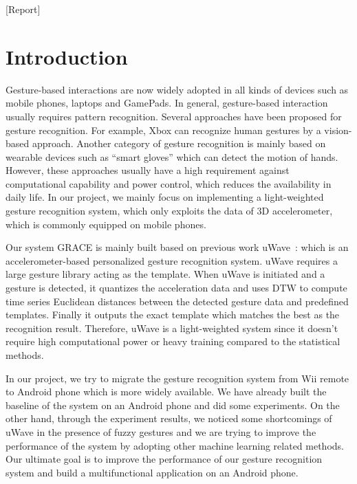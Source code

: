 \documentclass{acm_proc_article-sp}
\begin{document}
[Report]



\section{Introduction}
\label{introduction}
Gesture-based interactions are now widely adopted in all kinds of devices such as mobile phones, laptops and GamePads. In general, gesture-based interaction usually requires pattern recognition. Several approaches have been proposed for gesture recognition. For example, Xbox can recognize human gestures by a vision-based approach. Another category of gesture recognition is mainly based on wearable devices such as ``smart gloves'' which can detect the motion of hands. However, these approaches usually have a high requirement against computational capability and power control, which reduces the availability in daily life. In our project, we mainly focus on implementing a light-weighted gesture recognition system, which only exploits the data of 3D accelerometer, which is commonly equipped on mobile phones.

Our system GRACE is mainly built based on previous work uWave~\cite{liu2009uwave}: which is an accelerometer-based personalized gesture recognition system. uWave requires a large gesture library acting as the template. When uWave is initiated and a gesture is detected, it quantizes the acceleration data and uses DTW to compute time series Euclidean distances between the detected gesture data and predefined templates. Finally it outputs the exact template which matches the best as the recognition result. Therefore, uWave is a light-weighted system since it doesn't require high computational power or heavy training compared to the statistical methods.

In our project, we try to migrate the gesture recognition system from Wii remote to Android phone which is more widely available. We have already built the baseline of the system on an Android phone and did some experiments. On the other hand, through the experiment results, we noticed some shortcomings of uWave in the presence of fuzzy gestures and we are trying to improve the performance of the system by adopting other machine learning related methods. Our ultimate goal is to improve the performance of our gesture recognition system and build a multifunctional application on an Android phone.
\end{document}
